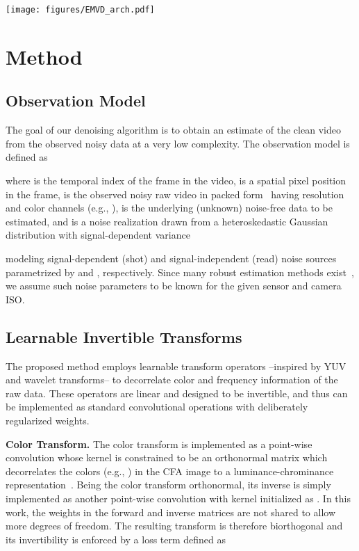 \documentclass[final]{cvpr}
\begin{document}
    \begin{figure*}[ht!]
        \centering
        \texttt{[image: figures/EMVD\_arch.pdf]}
        \caption{Architecture of the proposed multi-stage video denoising EMVD. Refer to Section~\ref{section:method} for details.}
        \label{fig:architecture} 
    \end{figure*}
    
    \section{Method}
    \label{section:method}

    \subsection{Observation Model}
    
    The goal of our denoising algorithm is to obtain an estimate of the clean video from the observed noisy data at a very low complexity. The observation model is defined as
    
    where  is the temporal index of the frame in the video,  is a spatial pixel position in the frame,  is the observed noisy raw video in packed form~\cite{gharbi2016jdd} having  resolution and  color channels (e.g., ),  is the underlying (unknown) noise-free data to be estimated, and  is a noise realization drawn from a heteroskedastic Gaussian distribution with signal-dependent variance
    
    modeling signal-dependent (shot) and signal-independent (read) noise sources parametrized by  and , respectively. Since many robust estimation methods exist~\cite{foi2008noisemodel, azzari2014noiseestimation}, we assume such noise parameters to be known for the given sensor and camera ISO.
    
    \subsection{Learnable Invertible Transforms}
    
    The proposed method employs learnable transform operators --inspired by YUV and wavelet transforms-- to decorrelate color and frequency information of the raw data. These operators are linear and designed to be invertible, and thus can be implemented as standard convolutional operations with deliberately regularized weights.
    
    \textbf{Color Transform.} The color transform  is implemented as a point-wise convolution whose kernel is constrained to be an orthonormal matrix  which decorrelates the  colors (e.g., ) in the CFA image to a luminance-chrominance representation~\cite{buades2020cfa}. Being the color transform orthonormal, its inverse  is simply implemented as another point-wise convolution with kernel initialized as . In this work, the weights in the forward and inverse matrices are not shared to allow more degrees of freedom. The resulting transform is therefore biorthogonal and its invertibility is enforced by a loss term defined as
    
\end{document}
